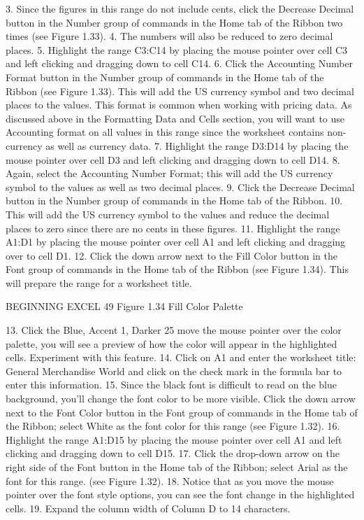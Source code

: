 3. Since the figures in this range do not include cents, click the Decrease Decimal button in the
Number group of commands in the Home tab of the Ribbon two times (see Figure 1.33).
4. The numbers will also be reduced to zero decimal places.
5. Highlight the range C3:C14 by placing the mouse pointer over cell C3 and left clicking and
dragging down to cell C14.
6. Click the Accounting Number Format button in the Number group of commands in the Home
tab of the Ribbon (see Figure 1.33). This will add the US currency symbol and two decimal
places to the values. This format is common when working with pricing data. As discussed
above in the Formatting Data and Cells section, you will want to use Accounting format on all
values in this range since the worksheet contains non-currency as well as currency data.
7. Highlight the range D3:D14 by placing the mouse pointer over cell D3 and left clicking and
dragging down to cell D14.
8. Again, select the Accounting Number Format; this will add the US currency symbol to the
values as well as two decimal places.
9. Click the Decrease Decimal button in the Number group of commands in the Home tab of the
Ribbon.
10. This will add the US currency symbol to the values and reduce the decimal places to zero since
there are no cents in these figures.
11. Highlight the range A1:D1 by placing the mouse pointer over cell A1 and left clicking and
dragging over to cell D1.
12. Click the down arrow next to the Fill Color button in the Font group of commands in the Home
tab of the Ribbon (see Figure 1.34). This will prepare the range for a worksheet title.




BEGINNING EXCEL 49
Figure 1.34 Fill Color Palette




13. Click the Blue, Accent 1, Darker 25%
move the mouse pointer over the color palette, you will see a preview of how the color will
appear in the highlighted cells. Experiment with this feature.
14. Click on A1 and enter the worksheet title: General Merchandise World and click on the check
mark in the formula bar to enter this information.
15. Since the black font is difficult to read on the blue background, you’ll change the font color to be
more visible. Click the down arrow next to the Font Color button in the Font group of
commands in the Home tab of the Ribbon; select White as the font color for this range
(see Figure 1.32).
16. Highlight the range A1:D15 by placing the mouse pointer over cell A1 and left clicking and
dragging down to cell D15.
17. Click the drop-down arrow on the right side of the Font button in the Home tab of the Ribbon;
select Arial as the font for this range. (see Figure 1.32).
18. Notice that as you move the mouse pointer over the font style options, you can see the font
change in the highlighted cells.
19. Expand the column width of Column D to 14 characters.



